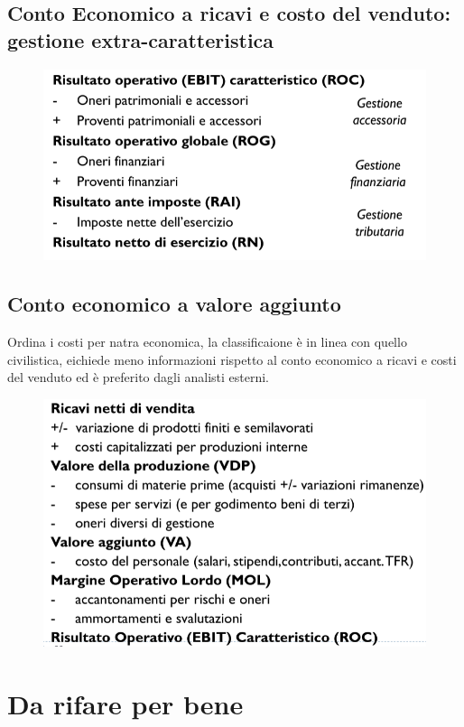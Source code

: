 \subsection{Conto Economico a ricavi e costo del
venduto: gestione extra-caratteristica}

\begin{figure}[H]
    \centering
    \includegraphics[width=0.5\linewidth]{2/img/Screenshot from 2022-07-10 11-21-34.png}
\end{figure}

\subsection{Conto economico a valore aggiunto}
Ordina i costi per natra economica, la classificaione è in linea con quello civilistica, eichiede meno informazioni rispetto
al conto economico a ricavi e costi del venduto ed è preferito dagli analisti esterni.


\begin{figure}[H]
    \centering
    \includegraphics[width=0.5\linewidth]{2/img/Screenshot from 2022-07-10 11-33-38.png}
\end{figure}


\section{Da rifare per bene}